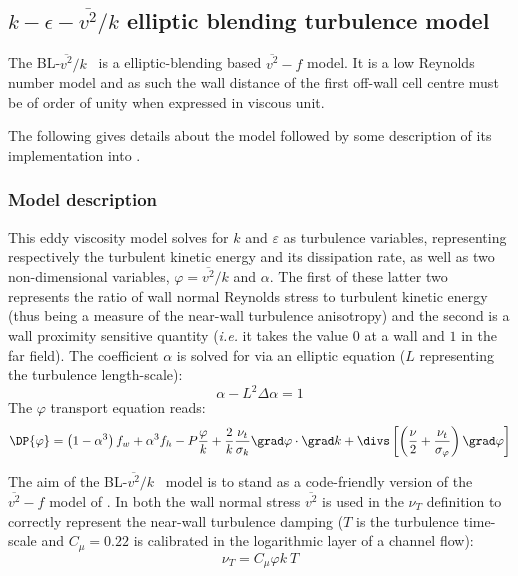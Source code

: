 \subsection{$k-\epsilon-\overline{v^2}/k$ elliptic blending turbulence model}

The BL-$\overline{v^2}/k$~ \cite{Billard:2012} is a  elliptic-blending based $\overline{v^2}-f$ model. 
It is a low Reynolds number model and as such the wall distance of the first off-wall cell centre must be of order of unity when expressed in viscous unit. 

The following gives details about the model followed by some description of its implementation into \CS. 

\subsubsection{Model description}

This eddy viscosity model solves for $k$ and $\varepsilon$ as turbulence variables, 
representing respectively the turbulent kinetic energy and its dissipation rate, 
as well as two non-dimensional variables, $\varphi=\overline{v^2}/k$ and $\alpha$. 
The first of these latter two represents the ratio of wall normal Reynolds stress 
to turbulent kinetic energy (thus being a measure of the near-wall turbulence anisotropy) 
and the second is a wall proximity sensitive quantity (\emph{i.e.} it takes the value $0$ at a wall and $1$ in the far field). 
The coefficient $\alpha$ is solved for via an elliptic equation 
($L$ representing the turbulence length-scale): 
\begin{equation}
		\alpha - L^2 \Delta \alpha = 1
		\label{eq:turbul:blv2kalpha}
\end{equation}
%
The $\varphi$ transport equation reads: 
%
\begin{equation}\label{eq:turbul:blv2kphi}
\DP{\varphi}  =   
   \left( 1-\alpha^3 \right) f_w
 + \alpha^3 f_h - P \frac{\varphi}{k} 
+  \frac{2}{k} \frac{\nu_t}{\sigma_k} \grad \varphi  \cdot \grad k + \divs \left[ \left( \frac{\nu}{2} + \frac{\nu_t}{\sigma_\varphi}  \right) \grad \varphi \right]
\end{equation}

The aim of the BL-$\overline{v^2}/k$~ model is to stand as a code-friendly version 
of the $\overline{v^2}-f$ model of \cite{Durbin:1991}. In both the wall normal stress 
$\overline{v^2}$ is used in the $\nu_T$ definition to correctly represent the near-wall turbulence 
damping ($T$ is the turbulence time-scale and $C_\mu=0.22$ is calibrated in the logarithmic layer of a channel flow):
%
\begin{equation}
	\nu_T= C_\mu \varphi k ~ T
\end{equation}


